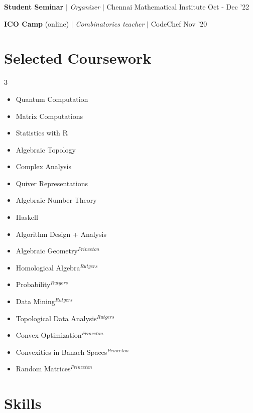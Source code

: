 \resumeProjectHeading
{\textbf{Student Seminar} $|$ \textit{Organizer} $|$ Chennai Mathematical Institute}
{Oct - Dec '22}
{}
\vspace{\mygap}

\resumeProjectHeading
{\textbf{ICO Camp}  (online) $|$ \textit{Combinatorics teacher} $|$ CodeChef}
{Nov '20}
{}


\resumeSubHeadingListEnd


\section{Selected Coursework}

\begin{multicols}{3}
\begin{itemize}
\setlength\itemsep{-0.5em}
\item Quantum Computation
\item Matrix Computations
\item Statistics with R
\item {\color{gray}Algebraic Topology}
\item Complex Analysis
\item {\color{gray}Quiver Representations}
\item {\color{gray}Algebraic Number Theory}
\item Haskell
\item Algorithm Design + Analysis
\item {\color{gray}Algebraic Geometry}$^{Princeton}$
\item {\color{gray}Homological Algebra}$^{Rutgers}$
\item Probability$^{Rutgers}$
\item Data Mining$^{Rutgers}$
\item Topological Data Analysis$^{Rutgers}$
\item Convex Optimization$^{Princeton}$
\item Convexities in Banach Spaces$^{Princeton}$
\item Random Matrices$^{Princeton}$
\end{itemize}
\end{multicols}


\vspace{-5pt}




\section{Skills}

